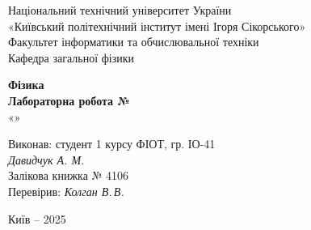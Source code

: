 \documentclass[12pt,a4paper]{article}
\begin{document}
    \begin{titlepage}

        \thispagestyle{empty}
        \begin{center}
        \large
        Національний технічний університет України\\
        «Київський політехнічний інститут імені Ігоря Сікорського»\\[1em]
        Факультет інформатики та обчислювальної техніки\\
        Кафедра загальної фізики
        \end{center}

        \vfill

        \begin{center}
        \textbf{\Large Фізика}\\[2em]
        \textbf{\Large Лабораторна робота №}\\
        «» 
        \end{center}

        \vfill

        \begin{flushright}
        Виконав: студент 1 курсу ФІОТ, гр. ІО-41\\
        \textit{Давидчук А. М.}\\
        Залікова книжка № 4106\\[1em]
        Перевірив: \textit{Колган В.\,В.}
        \end{flushright}

        \vfill

        \begin{center}
        Київ -- 2025
        \end{center}

    \end{titlepage}

\end{document}
